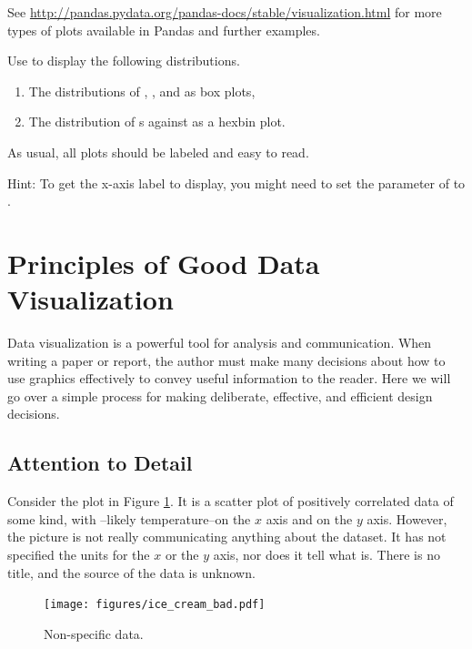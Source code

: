 See \url{http://pandas.pydata.org/pandas-docs/stable/visualization.html} for more types of plots available in Pandas and further examples.

\begin{problem}
Use  to display the following distributions.
\begin{enumerate}
        \item The distributions of , , and  as box plots,
        \item The distribution of s against  as a hexbin plot.
\end{enumerate}
As usual, all plots should be labeled and easy to read.

\noindent Hint: To get the x-axis label to display, you might need to set the  parameter of  to .
\end{problem}

\section*{Principles of Good Data Visualization} %

Data visualization is a powerful tool for analysis and communication.
When writing a paper or report, the author must make many decisions about how to use graphics effectively to convey useful information to the reader.
Here we will go over a simple process for making deliberate, effective, and efficient design decisions.

\subsection*{Attention to Detail} %

Consider the plot in Figure \ref{fig:nolabels}.
It is a scatter plot of positively correlated data of some kind, with --likely temperature--on the $x$ axis and  on the $y$ axis.
However, the picture is not really communicating anything about the dataset.
It has not specified the units for the $x$ or the $y$ axis, nor does it tell what  is.
There is no title, and the source of the data is unknown.

\begin{figure}[H]
    \centering
    \texttt{[image: figures/ice\_cream\_bad.pdf]}
    \caption{Non-specific data.}
    \label{fig:nolabels}
\end{figure}

